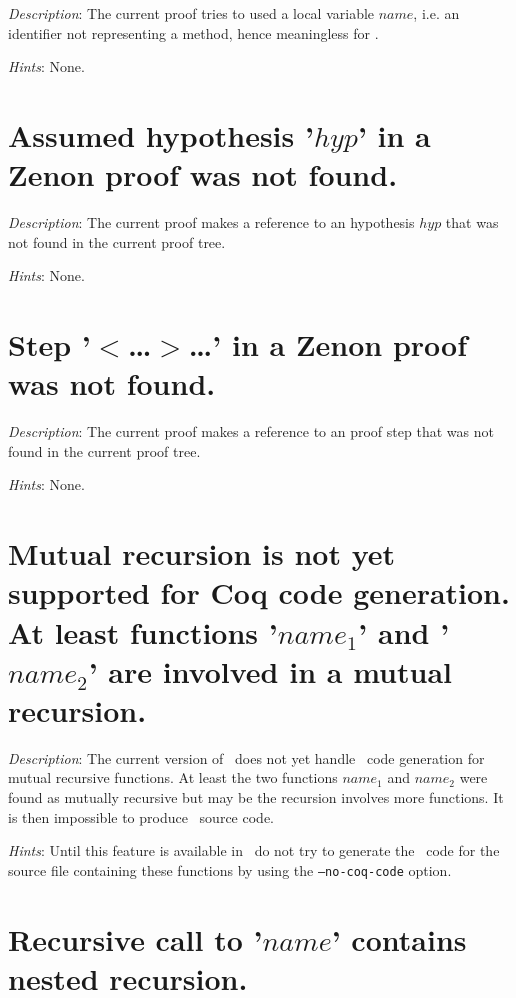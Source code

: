 {\em Description}: The current proof tries to used a local variable
$name$, i.e. an identifier not representing a method, hence
meaningless for \zenon.

{\em Hints}: None.



\section*{Assumed hypothesis '$hyp$' in a Zenon proof was not found.}

{\em Description}: The current proof makes a reference to an
hypothesis $hyp$ that was not found in the current proof tree.

{\em Hints}: None.



\section*{Step '$<$\ldots$>$\ldots' in a Zenon proof was not found.}

{\em Description}: The current proof makes a reference to an
proof step that was not found in the current proof tree.

{\em Hints}: None.


\section*{Mutual recursion is not yet supported for Coq code
  generation. At least functions '$name_1$' and '$name_2$' are
  involved in a mutual recursion.}

{\em Description}: The current version of \focal\ does not yet handle
\coq\ code generation for mutual recursive functions. At least the two
functions $name_1$ and $name_2$ were found as mutually recursive but
may be the recursion involves more functions. It is then impossible to
produce \coq\ source code.


{\em Hints}: Until this feature is available in \focal\, do not try to
generate the \coq\ code for the source file containing these functions
by using the {\tt --no-coq-code} option.


\section*{Recursive call to '$name$' contains nested recursion.}

